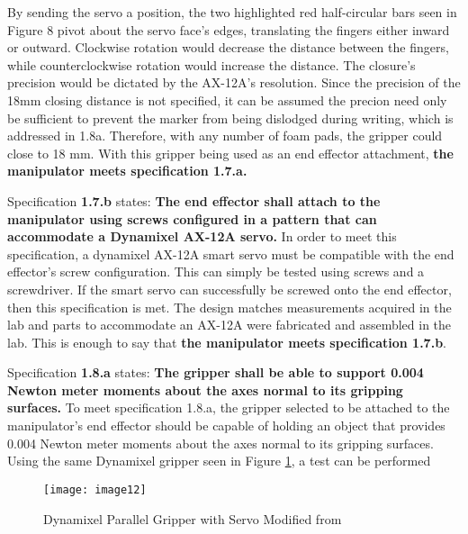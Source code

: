 By sending the servo a position, the two highlighted red half-circular bars seen in Figure 8 pivot about the servo face’s edges, translating the fingers either inward or outward. Clockwise rotation would decrease the distance between the fingers, while counterclockwise rotation would increase the distance. The closure’s precision would be dictated by the AX-12A’s resolution. Since the precision of the 18mm closing distance is not specified, it can be assumed the precion need only be sufficient to prevent the marker from being dislodged during writing, which is addressed in 1.8a. Therefore, with any number of foam pads, the gripper could close to 18 mm. With this gripper being used as an end effector attachment, \textbf{the manipulator meets specification 1.7.a.}


Specification \textbf{1.7.b} states: \textbf{The end effector shall attach to the manipulator using screws configured in a pattern that can accommodate a Dynamixel AX-12A servo.} In order to meet this specification, a dynamixel AX-12A smart servo must be compatible with the end effector’s screw configuration. This can simply be tested using screws and a screwdriver. If the smart servo can successfully be screwed onto the end effector, then this specification is met. The design matches measurements acquired in the lab and parts to accommodate an AX-12A were fabricated and assembled in the lab. This is enough to say that \textbf{the manipulator meets specification 1.7.b}.


Specification \textbf{1.8.a} states: \textbf{The gripper shall be able to support 0.004 Newton meter moments about the axes normal to its gripping surfaces.} To meet specification 1.8.a, the gripper selected to be attached to the manipulator’s end effector should be capable of holding an object that provides 0.004 Newton meter moments about the axes normal to its gripping surfaces. Using the same Dynamixel gripper seen in Figure \ref{fig:gripper4}, a test can be performed

\begin{figure}[htp]
  \centering
  \texttt{[image: image12]}
  \caption{Dynamixel Parallel Gripper with Servo Modified from \cite{gripper1}}
  \label{fig:gripper4}
\end{figure}

